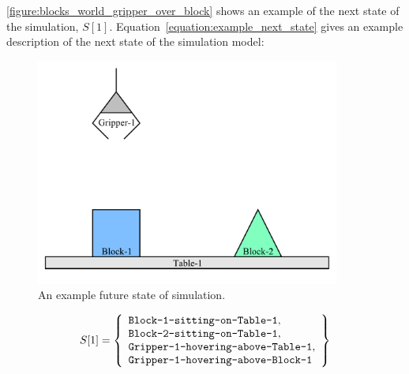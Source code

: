 \autoref{figure:blocks_world_gripper_over_block} shows an example of
the next state of the simulation, $S[1]$.
Equation~\ref{equation:example_next_state} gives an example
description of the next state of the simulation model:
\begin{figure}[bth]
\includegraphics[width=10cm]{gfx/blocks_world_gripper_over_block}
\caption{An example future state of simulation.}
\label{figure:blocks_world_gripper_over_block}
\end{figure}
\begin{equation}
\label{equation:example_next_state}
S[1] =
  \left\{
    \begin{array}{l}
      \text{{\tt Block-1-sitting-on-Table-1}}, \\
      \text{{\tt Block-2-sitting-on-Table-1}}, \\
      \text{{\tt Gripper-1-hovering-above-Table-1}}, \\
      \text{{\tt Gripper-1-hovering-above-Block-1}}
    \end{array}
  \right\}
\end{equation}

